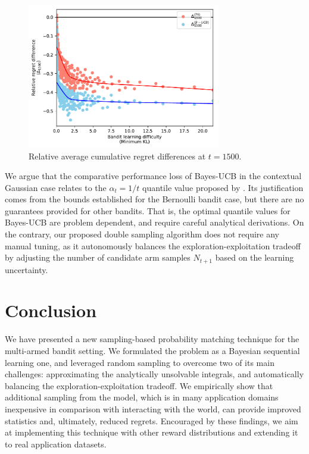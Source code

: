 \documentclass{article}
\begin{document}
\begin{figure}[!h]
	\centering
	\includegraphics[width=0.75\textwidth]{./figs/linearGaussian/min_KL_relDiff_Nmax1000_t1499_09.pdf}
	\caption{Relative average cumulative regret differences at $t=1500$.}
	\label{fig:linearGaussian_relative_cumregret_kl}
\end{figure}

We argue that the comparative performance loss of Bayes-UCB in the contextual Gaussian case relates to the $\alpha_t = 1/t$ quantile value proposed by \cite{ip-Kaufmann2012}. Its justification comes from the bounds established for the Bernoulli bandit case, but there are no guarantees provided for other bandits. That is, the optimal quantile values for Bayes-UCB are problem dependent, and require careful analytical derivations. On the contrary, our proposed double sampling algorithm does not require any manual tuning, as it autonomously balances the exploration-exploitation tradeoff by adjusting the number of candidate arm samples $N_{t+1}$ based on the learning uncertainty.

\section{Conclusion}
\label{sec:conclusion}

We have presented a new sampling-based probability matching technique for the multi-armed bandit setting. We formulated the problem as a Bayesian sequential learning one, and leveraged random sampling to overcome two of its main challenges: approximating the analytically unsolvable integrals, and automatically balancing the exploration-exploitation tradeoff. We empirically show that additional sampling from the model, which is in many application domains inexpensive in comparison with interacting with the world, can provide improved statistics and, ultimately, reduced regrets. Encouraged by these findings, we aim at implementing this technique with other reward distributions and extending it to real application datasets.
\end{document}
